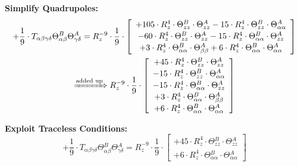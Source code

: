 \documentclass{article}
\begin{document}
\textbf{Simplify Quadrupoles:}
\begin{subequations}\begin{gather}
+ \frac{1}{9} \cdot T_{\alpha{}\beta{}\gamma{}\delta{}} \Theta{}^{B}_{\alpha{}\beta{}} \Theta{}^{A}_{\gamma{}\delta{}} = R_{z}^{-9} \cdot \frac{1}{9} \cdot  \left[ \begin{array}{c} 
 		+ 105 \cdot R_{z}^{4} \cdot \Theta{}^{B}_{zz} \cdot \Theta{}^{A}_{zz}- 15 \cdot R_{z}^{4} \cdot \Theta{}^{B}_{zz} \cdot \Theta{}^{A}_{\alpha{}\alpha{}} 
 \\[0.2em] 		 - 60 \cdot R_{z}^{4} \cdot \Theta{}^{B}_{zz} \cdot \Theta{}^{A}_{zz}- 15 \cdot R_{z}^{4} \cdot \Theta{}^{B}_{\alpha{}\alpha{}} \cdot \Theta{}^{A}_{zz} 
 \\[0.2em] 		 + 3 \cdot R_{z}^{4} \cdot \Theta{}^{B}_{\alpha{}\alpha{}} \cdot \Theta{}^{A}_{\beta{}\beta{}}+ 6 \cdot R_{z}^{4} \cdot \Theta{}^{B}_{\alpha{}\alpha{}} \cdot \Theta{}^{A}_{\alpha{}\alpha{}}
 \end{array}\right] 
\\ \xRightarrow{\text{added up}}
 R_{z}^{-9} \cdot \frac{1}{9} \cdot  \left[ \begin{array}{c} 
 		+ 45 \cdot R_{z}^{4} \cdot \Theta{}^{B}_{zz} \cdot \Theta{}^{A}_{zz} 
 \\[0.2em] 		 - 15 \cdot R_{z}^{4} \cdot \Theta{}^{B}_{zz} \cdot \Theta{}^{A}_{\alpha{}\alpha{}} 
 \\[0.2em] 		 - 15 \cdot R_{z}^{4} \cdot \Theta{}^{B}_{\alpha{}\alpha{}} \cdot \Theta{}^{A}_{zz} 
 \\[0.2em] 		 + 3 \cdot R_{z}^{4} \cdot \Theta{}^{B}_{\alpha{}\alpha{}} \cdot \Theta{}^{A}_{\beta{}\beta{}} 
 \\[0.2em] 		 + 6 \cdot R_{z}^{4} \cdot \Theta{}^{B}_{\alpha{}\alpha{}} \cdot \Theta{}^{A}_{\alpha{}\alpha{}}
 \end{array}\right] 
\end{gather}\end{subequations}


\textbf{Exploit Traceless Conditions:}
\begin{equation}
+ \frac{1}{9} \cdot T_{\alpha{}\beta{}\gamma{}\delta{}} \Theta{}^{B}_{\alpha{}\beta{}} \Theta{}^{A}_{\gamma{}\delta{}} = R_{z}^{-9} \cdot \frac{1}{9} \cdot  \left[ \begin{array}{c} 
 		+ 45 \cdot R_{z}^{4} \cdot \Theta{}^{B}_{zz} \cdot \Theta{}^{A}_{zz} 
 \\[0.2em] 		 + 6 \cdot R_{z}^{4} \cdot \Theta{}^{B}_{\alpha{}\alpha{}} \cdot \Theta{}^{A}_{\alpha{}\alpha{}}
 \end{array}\right] 
\end{equation}
\end{document}
